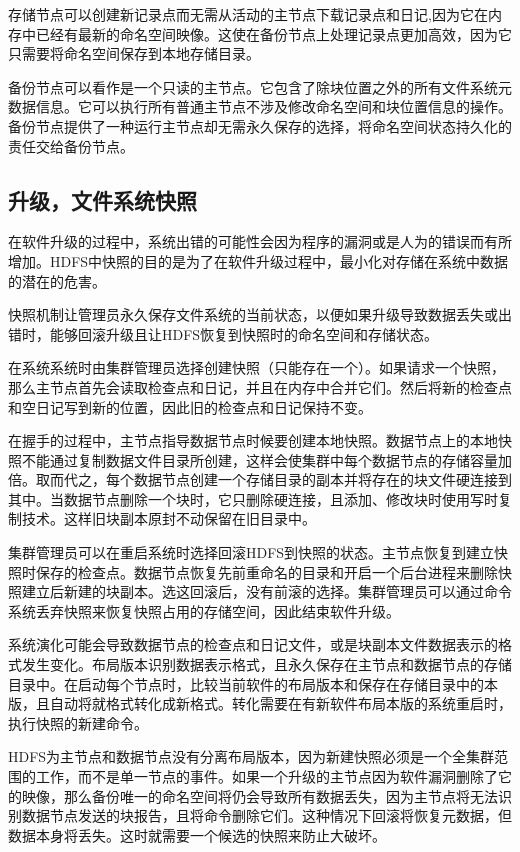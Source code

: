 存储节点可以创建新记录点而无需从活动的主节点下载记录点和日记,因为它在内存中已经有最新的命名空间映像。这使在备份节点上处理记录点更加高效，因为它只需要将命名空间保存到本地存储目录。

备份节点可以看作是一个只读的主节点。它包含了除块位置之外的所有文件系统元数据信息。它可以执行所有普通主节点不涉及修改命名空间和块位置信息的操作。备份节点提供了一种运行主节点却无需永久保存的选择，将命名空间状态持久化的责任交给备份节点。

\subsection{升级，文件系统快照}

在软件升级的过程中，系统出错的可能性会因为程序的漏洞或是人为的错误而有所增加。HDFS中快照的目的是为了在软件升级过程中，最小化对存储在系统中数据的潜在的危害。

快照机制让管理员永久保存文件系统的当前状态，以便如果升级导致数据丢失或出错时，能够回滚升级且让HDFS恢复到快照时的命名空间和存储状态。

在系统系统时由集群管理员选择创建快照（只能存在一个）。如果请求一个快照，那么主节点首先会读取检查点和日记，并且在内存中合并它们。然后将新的检查点和空日记写到新的位置，因此旧的检查点和日记保持不变。

在握手的过程中，主节点指导数据节点时候要创建本地快照。数据节点上的本地快照不能通过复制数据文件目录所创建，这样会使集群中每个数据节点的存储容量加倍。取而代之，每个数据节点创建一个存储目录的副本并将存在的块文件硬连接到其中。当数据节点删除一个块时，它只删除硬连接，且添加、修改块时使用写时复制技术。这样旧块副本原封不动保留在旧目录中。

集群管理员可以在重启系统时选择回滚HDFS到快照的状态。主节点恢复到建立快照时保存的检查点。数据节点恢复先前重命名的目录和开启一个后台进程来删除快照建立后新建的块副本。选这回滚后，没有前滚的选择。集群管理员可以通过命令系统丢弃快照来恢复快照占用的存储空间，因此结束软件升级。

系统演化可能会导致数据节点的检查点和日记文件，或是块副本文件数据表示的格式发生变化。布局版本识别数据表示格式，且永久保存在主节点和数据节点的存储目录中。在启动每个节点时，比较当前软件的布局版本和保存在存储目录中的本版，且自动将就格式转化成新格式。转化需要在有新软件布局本版的系统重启时，执行快照的新建命令。

HDFS为主节点和数据节点没有分离布局版本，因为新建快照必须是一个全集群范围的工作，而不是单一节点的事件。如果一个升级的主节点因为软件漏洞删除了它的映像，那么备份唯一的命名空间将仍会导致所有数据丢失，因为主节点将无法识别数据节点发送的块报告，且将命令删除它们。这种情况下回滚将恢复元数据，但数据本身将丢失。这时就需要一个候选的快照来防止大破坏。

